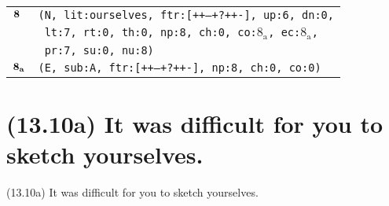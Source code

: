 \documentclass{article}
\begin{document}
\begin{minipage}{\textwidth}
{\begin{tabular}{|r|l|}
    ${\textbf{\textrm{8}}_{\phantom{z}}}$ & \texttt{\texttt{(N,~lit:ourselves,~ftr:[++--+?++-],~up:6,~dn:0,}} \\
    & \texttt{\texttt{~lt:7,~rt:0,~th:0,~np:8,~ch:0,~co:${\textrm{8}_{\textrm{a}}}$,~ec:${\textrm{8}_{\textrm{a}}}$,}} \\
    & \texttt{\texttt{~pr:7,~su:0,~nu:8)}} \\
    ${\textbf{\textrm{8}}_{\textbf{\textrm{a}}}}$ & \texttt{\texttt{(E,~sub:A,~ftr:[++--+?++-],~np:8,~ch:0,~co:0)}} \\
    \hline
  \end{tabular}
  }
\end{minipage}
\bigbreak

\clearpage

%
%

\section*{(13.10a) It was difficult for you to sketch yourselves.}

\bigbreak
\begin{enumerate*}
\item[(13.10a)] It was difficult for you to sketch yourselves.
\end{enumerate*}
\bigbreak
\end{document}
